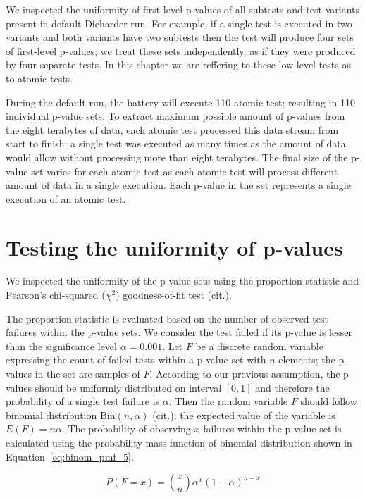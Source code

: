 \documentclass[
  digital,  	%
  color,		%
  oneside,   	%
  12pt,
  nocover,
  notable,
  nolof,
  nolot,
]{fithesis3}
\theoremstyle{definition}
\theoremstyle{remark}
\begin{document}
We inspected the uniformity of first-level p-values of all subtests and test variants present in default Dieharder run. For example, if a single test is executed in two variants and both variants have two subtests then the test will produce four sets of first-level p-values; we treat these sets independently, as if they were produced by four separate tests. In this chapter we are reffering to these low-level tests as to atomic tests.

During the default run, the battery will execute 110 atomic test; resulting in 110 individual p-value sets. To extract maximum possible amount of p-values from the eight terabytes of data, each atomic test processed this data stream from start to finish; a single test was executed as many times as the amount of data would allow without processing more than eight terabytes. The final size of the p-value set varies for each atomic test as each atomic test will process different amount of data in a single execution. Each p-value in the set represents a single execution of an atomic test.

\section{Testing the uniformity of p-values}
We inspected the uniformity of the p-value sets using the proportion statistic and Pearson's chi-squared ($\chi^2$) goodness-of-fit test (cit.).

The proportion statistic is evaluated based on the number of observed test failures within the p-value sets. We consider the test failed if its p-value is lesser than the significance level $\alpha=0.001$. Let $F$ be a discrete random variable expressing the count of failed tests within a p-value set with $n$ elements; the p-values in the set are samples of $F$. According to our previous assumption, the p-values should be uniformly distributed on interval $[0,1]$ and therefore the probability of a single test failure is $\alpha$. Then the random variable $F$ should follow binomial distribution $\text{Bin}(n,\alpha)$ (cit.); the expected value of the variable is $E(F) = n\alpha$. The probability of observing $x$ failures within the p-value set is calculated using the probability mass function of binomial distribution shown in Equation~\ref{eq:binom_pmf_5}.

\begin{equation}
\label{eq:binom_pmf_5}
P(F = x) = \binom xn \alpha^x(1-\alpha)^{n-x}
\end{equation}
\end{document}

